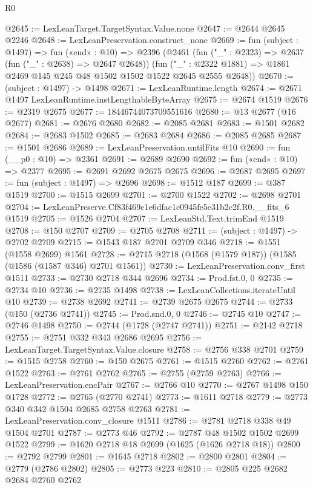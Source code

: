 \begin{lexlean}{R0}
\begin{coremodule}
@2645 := LexLeanTarget.TargetSyntax.Value.none
@2647 := @2644 @2645 @2246
@2648 := LexLeanPreservation.construct_none
@2669 := fun (subject : @1497) =>
  fun («end» : @10) =>
  @2396
    (@2461
      (fun ("_" : @2323) => @2637 (fun ("_" : @2638) => @2647 @2648))
      (fun ("_" : @2322 @1881) => @1861 @2469 @145 @245 @48 @1502 @1502 @1522 @2645 @2555 @2648))
@2670 := (subject : @1497) -> @1498
@2671 := LexLeanRuntime.length
@2674 := @2671 @1497 LexLeanRuntime.instLengthableByteArray
@2675 := @2674 @1519
@2676 := @2319 @2675
@2677 := 18446744073709551616
@2680 := @13 @2677 (@16 @2677)
@2681 := @2676 @2680
@2682 := @2085 @2681
@2683 := @1501 @2682
@2684 := @2683 @1502
@2685 := @2683 @2684
@2686 := @2085 @2685
@2687 := @1501 @2686
@2689 := LexLeanPreservation.untilFits @10
@2690 := fun (__p0 : @10) => @2361
@2691 := @2689 @2690
@2692 := fun («end» : @10) => @2377
@2695 := @2691 @2692 @2675 @2675
@2696 := @2687 @2695
@2697 := fun (subject : @1497) => @2696
@2698 := @1512 @187
@2699 := @387 @1519
@2700 := @1515 @2699
@2701 := @2700 @1522
@2702 := @2698 @2701
@2704 := LexLeanPreserve.Cf83f469c1e6dfac1c0945fe5e31b2c2f.R0.__fits_6 @1519
@2705 := @1526 @2704
@2707 := LexLeanStd.Text.trimEnd @1519
@2708 := @150 @2707
@2709 := @2705 @2708
@2711 := (subject : @1497) -> @2702 @2709
@2715 := @1543 @187 @2701 @2709 @346
@2718 := @1551 (@1558 @2699) @1561
@2728 := @2715 @2718 (@1568 (@1579 @187)) (@1585 (@1586 (@1587 @346) @2701 @1561))
@2730 := LexLeanPreservation.conv_first @1511
@2733 := @2730 @2718 @344 @2696
@2734 := Prod.fst.{0, 0}
@2735 := @2734 @10
@2736 := @2735 @1498
@2738 := LexLeanCollections.iterateUntil @10
@2739 := @2738 @2692
@2741 := @2739 @2675 @2675
@2744 := @2733 (@150 (@2736 @2741))
@2745 := Prod.snd.{0, 0}
@2746 := @2745 @10
@2747 := @2746 @1498
@2750 := @2744 (@1728 (@2747 @2741))
@2751 := @2142 @2718
@2755 := @2751 @332 @343 @2686 @2695
@2756 := LexLeanTarget.TargetSyntax.Value.closure
@2758 := @2756 @338 @2701
@2759 := @1515 @2758
@2760 := @150 @2675
@2761 := @1515 @2760
@2762 := @2761 @1522
@2763 := @2761 @2762
@2765 := @2755 (@2759 @2763)
@2766 := LexLeanPreservation.encPair
@2767 := @2766 @10
@2770 := @2767 @1498 @150 @1728
@2772 := @2765 (@2770 @2741)
@2773 := @1611 @2718
@2779 := @2773 @340 @342 @1504 @2685 @2758 @2763
@2781 := LexLeanPreservation.conv_closure @1511
@2786 := @2781 @2718 @338 @49 @1504 @2701
@2787 := @2773 @46
@2792 := @2787 @48 @1502 @1502 @2699 @1522
@2799 := @1620 @2718 @18 @2699 (@1625 (@1626 @2718 @18))
@2800 := @2792 @2799
@2801 := @1645 @2718
@2802 := @2800 @2801
@2804 := @2779 (@2786 @2802)
@2805 := @2773 @223
@2810 := @2805 @225 @2682 @2684 @2760 @2762

\end{coremodule}
\end{lexlean}
